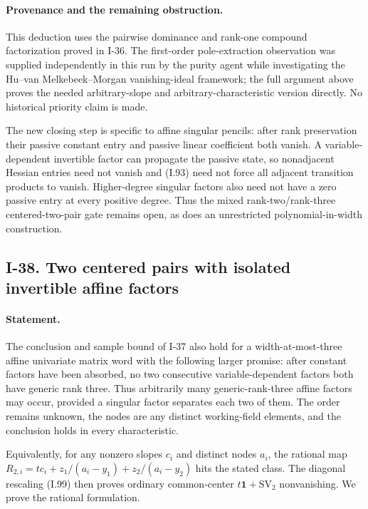 \paragraph{Provenance and the remaining obstruction.}
This deduction uses the pairwise dominance and rank-one compound
factorization proved in I-36. The first-order pole-extraction
observation was supplied independently in this run by the purity
agent while investigating the Hu--van Melkebeek--Morgan
vanishing-ideal framework; the full argument above proves the
needed arbitrary-slope and arbitrary-characteristic version
directly. No historical priority claim is made.

The new closing step is specific to affine singular pencils:
after rank preservation their passive constant entry and passive
linear coefficient both vanish. A variable-dependent invertible
factor can propagate the passive state, so nonadjacent Hessian
entries need not vanish and (I.93) need not force all adjacent
transition products to vanish. Higher-degree singular factors
also need not have a zero passive entry at every positive degree.
Thus the mixed rank-two/rank-three centered-two-pair gate remains
open, as does an unrestricted polynomial-in-width construction.

\subsection{I-38. Two centered pairs with isolated invertible affine factors}
\label{I-38}

\paragraph{Statement.}
The conclusion and sample bound of I-37 also hold for a width-at-most-three
affine univariate matrix word with the following larger promise:
after constant factors have been absorbed, no two consecutive
variable-dependent factors both have generic rank three. Thus
arbitrarily many generic-rank-three affine factors may occur,
provided a singular factor separates each two of them. The order
remains unknown, the nodes are any distinct working-field elements,
and the conclusion holds in every characteristic.

Equivalently, for any nonzero slopes $c_i$ and distinct nodes $a_i$,
the rational map $R_{2,i}=tc_i+z_1/(a_i-y_1)+z_2/(a_i-y_2)$
hits the stated class. The diagonal rescaling (I.99) then proves
ordinary common-center $t\mathbf1+\mathrm{SV}_2$ nonvanishing.
We prove the rational formulation.

